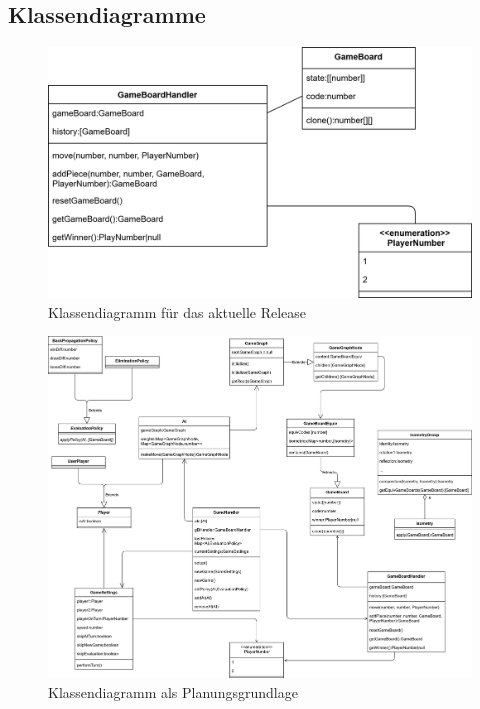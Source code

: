 \documentclass[titlepage]{scrartcl}
\begin{document}
\subsection{Klassendiagramme}
\begin{figure}[ht]
\includegraphics[width=\textwidth]{Klassendiagramme/Aktuell.png}
\caption{Klassendiagramm für das aktuelle Release}
\end{figure}
\begin{figure}[ht]
\includegraphics[width=\textwidth]{Klassendiagramme/Planung.png}
\caption{Klassendiagramm als Planungsgrundlage}
\end{figure}

\FloatBarrier
\end{document}
